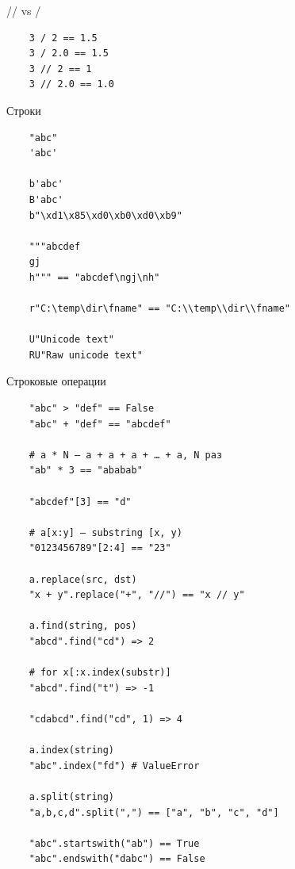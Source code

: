 \documentclass{article}
\begin{document}
\begin{center} // vs / \end{center}
\begin{lstlisting}
	3 / 2 == 1.5
	3 / 2.0 == 1.5
	3 // 2 == 1
	3 // 2.0 == 1.0
\end{lstlisting}
\newpage

\begin{center} Строки \end{center}
\vspace{15pt}
\begin{lstlisting}
	"abc"
	'abc'

	b'abc'
	B'abc'
	b"\xd1\x85\xd0\xb0\xd0\xb9"

	"""abcdef
	gj
	h""" == "abcdef\ngj\nh"

	r"C:\temp\dir\fname" == "C:\\temp\\dir\\fname"

	U"Unicode text"
	RU"Raw unicode text"
\end{lstlisting}
\newpage

\begin{center} Строковые операции \end{center}
\vspace{15pt}
\begin{lstlisting}
	"abc" > "def" == False
	"abc" + "def" == "abcdef"

	# a * N – a + a + a + … + a, N раз
	"ab" * 3 == "ababab"

	"abcdef"[3] == "d"

	# a[x:y] – substring [x, y)
	"0123456789"[2:4] == "23"

	a.replace(src, dst)
	"x + y".replace("+", "//") == "x // y"

	a.find(string, pos) 
	"abcd".find("cd") => 2
	
	# for x[:x.index(substr)]
	"abcd".find("t") => -1

	"cdabcd".find("cd", 1) => 4

	a.index(string)
	"abc".index("fd") # ValueError

	a.split(string) 
	"a,b,c,d".split(",") == ["a", "b", "c", "d"]

	"abc".startswith("ab") == True
	"abc".endswith("dabc") == False
\end{lstlisting}
\newpage
\end{document}
